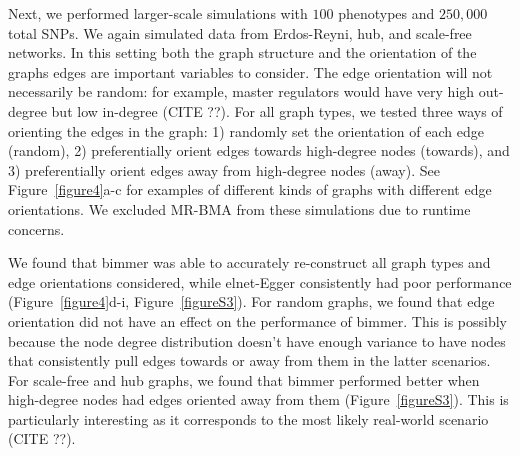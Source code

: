 \documentclass{article}
\begin{document}
Next, we performed larger-scale simulations with $100$ phenotypes and
$250,000$ total SNPs. We again
simulated data from Erdos-Reyni, hub, and scale-free networks. In this setting
both the graph structure and the orientation of the graphs edges are important
variables to consider. The edge orientation will not necessarily be random:
for example, master regulators would have very high out-degree but low in-degree (CITE ??).
For all graph types, we tested three ways of orienting the edges in the graph:
 1) randomly set the orientation
of each edge (random), 2) preferentially orient edges towards high-degree nodes (towards),
 and 3) preferentially orient edges away from high-degree nodes (away). See
 Figure~\ref{figure4}a-c for examples of different kinds of graphs with
 different edge orientations. We excluded
MR-BMA from these simulations due to runtime concerns.

We found that bimmer was able to accurately re-construct all graph types and edge
orientations considered, while
elnet-Egger consistently had poor performance (Figure~\ref{figure4}d-i, Figure~\ref{figureS3}).
 For random graphs, we found that edge orientation did not have an effect on the
 performance of bimmer. This is possibly because the node degree distribution
 doesn't have enough variance to have nodes that consistently pull edges towards
 or away from them in the latter scenarios. For scale-free and hub graphs, we
 found that bimmer performed better when high-degree nodes had edges oriented
 away from them (Figure~\ref{figureS3}). This is particularly interesting as
 it corresponds to the most likely real-world scenario (CITE ??).
\end{document}
